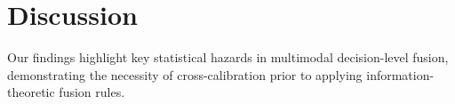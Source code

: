 \section{Discussion}
\label{sec:discussion}
Our findings highlight key statistical hazards in multimodal decision-level fusion, demonstrating the necessity of cross-calibration prior to applying information-theoretic fusion rules.
